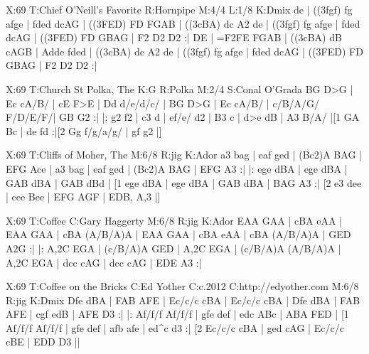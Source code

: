 \documentclass[letterpaper]{article}
\begin{document}
\begin{abc}[name]
X:69
T:Chief O'Neill's Favorite
R:Hornpipe
M:4/4
L:1/8
K:Dmix
de | ((3fgf) fg afge | fded dcAG | ((3FED) FD FGAB | ((3cBA) dc A2 de |
((3fgf) fg afge | fded dcAG | ((3FED) FD GBAG | F2 D2 D2 :|
DE | =F2FE FGAB | ((3cBA) dB cAGB | Adde fded | ((3cBA) dc A2 de |
((3fgf) fg afge | fded dcAG | ((3FED) FD GBAG | F2 D2 D2 :|
\end{abc}

\begin{abc}[name]
X:69
T:Church St Polka, The
K:G
R:Polka
M:2/4
S:Conal O'Grada
BG D>G | Ec cA/B/ | cE F>E | Dd d/e/d/c/ |
BG D>G | Ec cA/B/ | c/B/A/G/ F/D/E/F/| GB G2 :|
|: g2 f2 | c3 d | ef/e/ d2 | B3 c |
d>e dB | A3 B/A/ |[1 GA Bc | de fd :|[2 Gg f/g/a/g/ | gf g2 |]
\end{abc}

\begin{abc}[name]
X:69
T:Cliffs of Moher, The
M:6/8
R:jig
K:Ador
a3 bag | eaf ged | ({B}c2)A BAG | EFG Ace |
a3 bag | eaf ged | ({B}c2)A BAG | EFG A3 :|
|: ege dBA | ege dBA | GAB dBA | GAB dBd |
[1 ege dBA | ege dBA | GAB dBA | BAG A3 :|
[2 e3 dee | cee Bee | EFG AGF | EDB, A,3 |]
\end{abc}

\begin{abc}[name]
X:69
T:Coffee
C:Gary Haggerty
M:6/8
R:jig
K:Ador
EAA GAA | cBA eAA | EAA GAA | cBA (A/B/A)A |
EAA GAA | cBA eAA | cBA (A/B/A)A | GED A2G :|
|: A,2C EGA | (c/B/A)A GED | A,2C EGA | (c/B/A)A (A/B/A)A |
A,2C EGA | dcc cAG | dcc cAG | EDE A3 :|
\end{abc}

\begin{abc}[name]
X:69
T:Coffee on the Bricks
C:Ed Yother
C:c.2012
C:http://edyother.com
M:6/8
R:jig
K:Dmix
Dfe dBA | FAB AFE | Ec/c/c cBA | Ec/c/c cBA |
Dfe dBA | FAB AFE | cgf edB | AFE D3 :|
|: Af/f/f Af/f/f | gfe def | edc ABc | ABA FED |
[1 Af/f/f Af/f/f | gfe def | afb afe | ed^c d3 :|
[2 Ec/c/c cBA | ged cAG | Ec/c/c cBE | EDD D3 ||
\end{abc}
\end{document}
